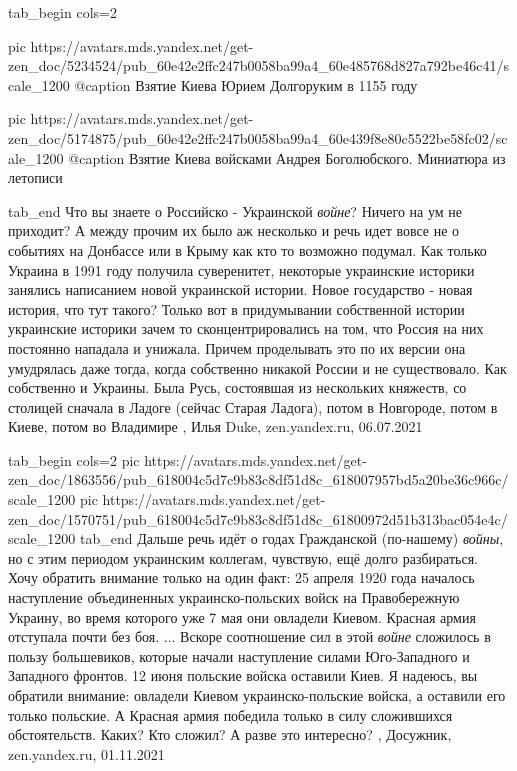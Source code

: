 \ifcmt
  tab_begin cols=2

     pic https://avatars.mds.yandex.net/get-zen_doc/5234524/pub_60e42e2ffc247b0058ba99a4_60e485768d827a792be46c41/scale_1200
		 @caption Взятие Киева Юрием Долгоруким в 1155 году

     pic https://avatars.mds.yandex.net/get-zen_doc/5174875/pub_60e42e2ffc247b0058ba99a4_60e439f8e80c5522be58fc02/scale_1200
		 @caption Взятие Киева войсками Андрея Боголюбского. Миниатюра из летописи

  tab_end
\fi
Что вы знаете о Российско - Украинской \emph{войне}? Ничего на ум не приходит?
А между прочим их было аж несколько и речь идет вовсе не о событиях на Донбассе
или в Крыму как кто то возможно подумал. Как только Украина в 1991 году
получила суверенитет, некоторые украинские историки занялись написанием новой
украинской истории. Новое государство - новая история, что тут такого? Только
вот в придумывании собственной истории украинские историки зачем то
сконцентрировались на том, что Россия на них постоянно нападала и унижала.
Причем проделывать это по их версии она умудрялась даже тогда, когда собственно
никакой России и не существовало. Как собственно и Украины. Была Русь,
состоявшая из нескольких княжеств, со столицей сначала в Ладоге (сейчас Старая
Ладога), потом в Новгороде, потом в Киеве, потом во Владимире
, Илья Duke, zen.yandex.ru, 06.07.2021

\ifcmt
  tab_begin cols=2
     pic https://avatars.mds.yandex.net/get-zen_doc/1863556/pub_618004c5d7c9b83c8df51d8c_618007957bd5a20be36c966c/scale_1200
     pic https://avatars.mds.yandex.net/get-zen_doc/1570751/pub_618004c5d7c9b83c8df51d8c_61800972d51b313bac054e4c/scale_1200
  tab_end
\fi
Дальше речь идёт о годах Гражданской (по-нашему) \emph{войны}, но с этим периодом
украинским коллегам, чувствую, ещё долго разбираться. Хочу обратить внимание
только на один факт: 25 апреля 1920 года началось наступление объединенных
украинско-польских войск на Правобережную Украину, во время которого уже 7 мая
они овладели Киевом.  Красная армия отступала почти без боя. ... Вскоре
соотношение сил в этой \emph{войне} сложилось в пользу большевиков, которые начали
наступление силами Юго-Западного и Западного фронтов. 12 июня польские войска
оставили Киев.  Я надеюсь, вы обратили внимание: овладели Киевом
украинско-польские войска, а оставили его только польские. А Красная армия
победила только в силу сложившихся обстоятельств. Каких? Кто сложил? А разве
это интересно?
, 
Досужник, zen.yandex.ru, 01.11.2021

